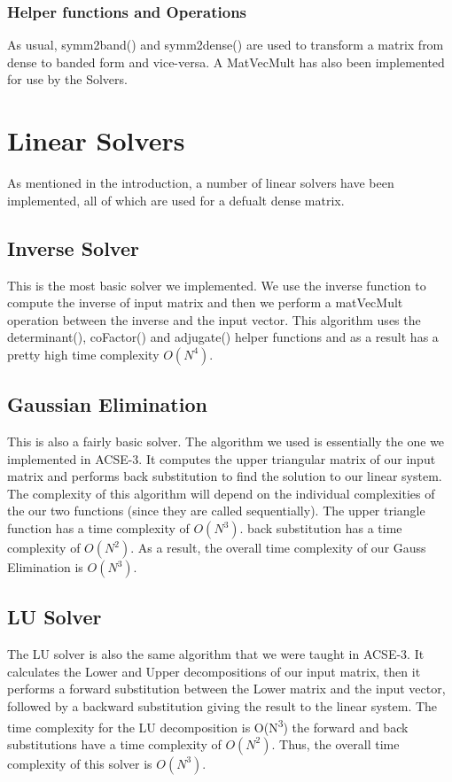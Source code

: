 \documentclass[11pt]{article}
\begin{document}
\subsubsection{Helper functions and Operations}
\label{sec:org4bd4ef5}
As usual,  symm2band() and symm2dense() are used to transform a matrix from
dense to banded form and vice-versa. A MatVecMult has also been implemented for
use by the Solvers.


\section{Linear Solvers}
\label{sec:org1dcd4d1}
As mentioned in the introduction, a number of linear solvers have been
implemented, all of which are used for a defualt dense matrix.
\subsection{Inverse Solver}
\label{sec:orgcbcf56e}
This is the most basic solver we implemented. We use the inverse function
to compute the inverse of input matrix and then we perform a matVecMult
operation between the inverse and the input vector. This algorithm uses the
determinant(), coFactor() and adjugate() helper functions and as a result has
a pretty high time complexity \(O(N^4)\).

\subsection{Gaussian Elimination}
\label{sec:orgd45e084}
This is also a fairly basic solver. The algorithm we used is essentially the
one we implemented in ACSE-3. It computes the upper triangular matrix of our
input matrix and performs back substitution to find the solution to our linear
system. The complexity of this algorithm will depend on the individual
complexities of the our two functions (since they are called sequentially).
The upper triangle function has a time complexity of \(O(N^3)\). back substitution has a time
complexity of \(O(N^2)\). As a result, the overall time complexity of our Gauss Elimination is \(O(N^3)\).

\subsection{LU Solver}
\label{sec:org972a800}
The LU solver is also the same algorithm that we were taught in ACSE-3. It
calculates the Lower and Upper decompositions of our input matrix, then it
performs a forward substitution between the Lower matrix and the input vector,
followed by a backward substitution giving the result to the linear system. The time
complexity for the LU decomposition is O(N\textsuperscript{3}) the forward and
back substitutions have a time complexity of \(O(N^2)\). Thus, the overall time
complexity of this solver is \(O(N^3)\).
\end{document}
